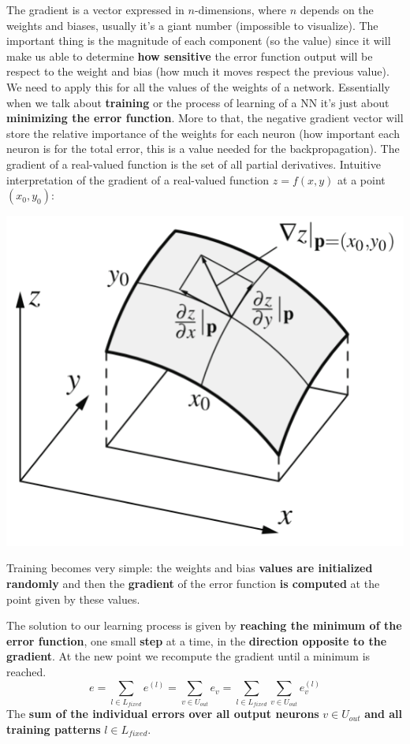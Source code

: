 The gradient is a vector expressed in $n$-dimensions, where $n$ depends on the weights and biases, usually it's a giant number (impossible to visualize). The important thing is the magnitude of each component (so the value) since it will make us able to determine \textbf{how sensitive} the error function output will be respect to the weight and bias (how much it moves respect the previous value). \\

We need to apply this for all the values of the weights of a network. Essentially when we talk about \textbf{training} or the process of learning of a NN it's just about \textbf{minimizing the error function}. More to that, the negative gradient vector will store the relative importance of the weights for each neuron (how important each neuron is for the total error, this is a value needed for the backpropagation). The gradient of a real-valued function is the set of all partial derivatives. Intuitive interpretation of the gradient of a real-valued function $z = f (x, y)$ at a point $(x_0, y_0)$:
\begin{center}
	\includegraphics[width=0.5\columnwidth]{img/NN/gradient1}
\end{center}

Training becomes very simple: the weights and bias \textbf{values are initialized randomly} and then the \textbf{gradient} of the error function \textbf{is computed} at the point given by these values.\\

\newpage

The solution to our learning process is given by \textbf{reaching the minimum of the error function}, one small \textbf{step} at a time, in the \textbf{direction opposite to the gradient}. At the new point we recompute the gradient until a minimum is reached.
$$ e = \sum_{l \in L_{fixed}} e^{(l)} = \sum_{v \in U_{out}} e_v = \sum_{l \in L_{fixed}} \sum_{v \in U_{out}} e_v^{(l)} $$
The \textbf{sum of the individual errors over all output neurons} $v \in U_{{out}}$ \textbf{and all training patterns} $l \in L_{fixed}$.\\

